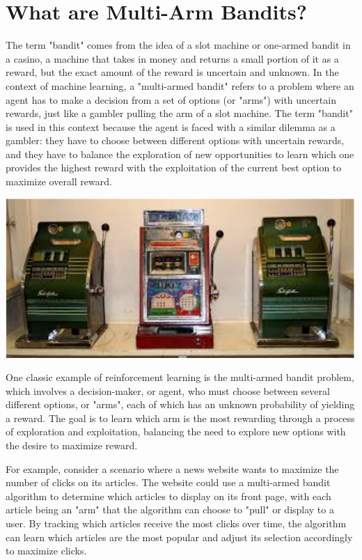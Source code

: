 \documentclass{article}
\begin{document}
\section{What are Multi-Arm Bandits?}
The term "bandit" comes from the idea of a slot machine or one-armed bandit in a casino, a machine that takes in money and returns a small portion of it as a reward, but the exact amount of the reward is uncertain and unknown.
In the context of machine learning, a "multi-armed bandit" refers to a problem where an agent has to make a decision from a set of options (or "arms") with uncertain rewards, just like a gambler pulling the arm of a slot machine.
The term "bandit" is used in this context because the agent is faced with a similar dilemma as a gambler: they have to choose between different options with uncertain rewards, and they have to balance the exploration of new opportunities to learn which one provides the highest reward with the exploitation of the current best option to maximize overall reward.

\begin{center}
    \includegraphics{slotmachine.png}
\end{center}

One classic example of reinforcement learning is the multi-armed bandit problem, which involves a decision-maker, or agent, who must choose between several different options, or "arms", each of which has an unknown probability of yielding a reward. The goal is to learn which arm is the most rewarding through a process of exploration and exploitation, balancing the need to explore new options with the desire to maximize reward.

For example, consider a scenario where a news website wants to maximize the number of clicks on its articles. The website could use a multi-armed bandit algorithm to determine which articles to display on its front page, with each article being an "arm" that the algorithm can choose to "pull" or display to a user. By tracking which articles receive the most clicks over time, the algorithm can learn which articles are the most popular and adjust its selection accordingly to maximize clicks.
\end{document}
